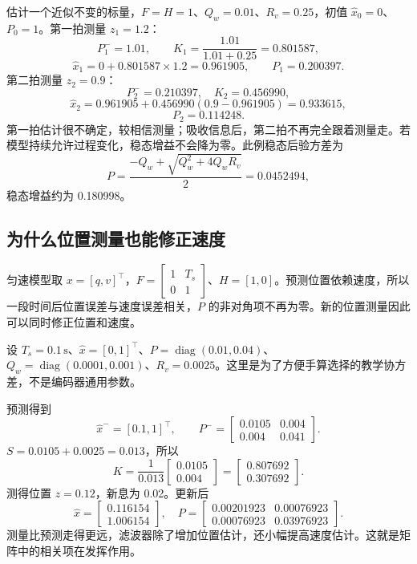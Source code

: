 \begin{examplebox}[算例 14B 两拍标量卡尔曼滤波]
估计一个近似不变的标量，$F=H=1$、$Q_w=0.01$、$R_v=0.25$，初值 $\hat x_0=0$、$P_0=1$。第一拍测量 $z_1=1.2$：
\[
P_1^-=1.01,\qquad K_1=\frac{1.01}{1.01+0.25}=0.801587,
\]
\[
\hat x_1=0+0.801587\times1.2=0.961905,
\qquad P_1=0.200397.
\]
第二拍测量 $z_2=0.9$：
\[
P_2^-=0.210397,\quad K_2=0.456990,
\]
\[
\hat x_2=0.961905+0.456990(0.9-0.961905)=0.933615,
\]
\[
P_2=0.114248.
\]
第一拍估计很不确定，较相信测量；吸收信息后，第二拍不再完全跟着测量走。若模型持续允许过程变化，稳态增益不会降为零。此例稳态后验方差为
\[
P=\frac{-Q_w+\sqrt{Q_w^2+4Q_wR_v}}2=0.0452494,
\]
稳态增益约为 0.180998。
\end{examplebox}

\subsection{为什么位置测量也能修正速度}

匀速模型取 $x=[q,v]^\top$，$F=\left[\begin{smallmatrix}1&T_s\\0&1\end{smallmatrix}\right]$、$H=[1,0]$。预测位置依赖速度，所以一段时间后位置误差与速度误差相关，$P$ 的非对角项不再为零。新的位置测量因此可以同时修正位置和速度。

\begin{examplebox}[算例 14C 矩阵卡尔曼的一次完整更新]
设 $T_s=0.1\,\mathrm{s}$、$\hat x=[0,1]^\top$、$P=\operatorname{diag}(0.01,0.04)$、$Q_w=\operatorname{diag}(0.0001,0.001)$、$R_v=0.0025$。这里是为了方便手算选择的教学协方差，不是编码器通用参数。

预测得到
\[
\hat x^-=[0.1,1]^\top,
\qquad P^-=\begin{bmatrix}0.0105&0.004\\0.004&0.041\end{bmatrix}.
\]
$S=0.0105+0.0025=0.013$，所以
\[
K=\frac1{0.013}\begin{bmatrix}0.0105\\0.004\end{bmatrix}
=\begin{bmatrix}0.807692\\0.307692\end{bmatrix}.
\]
测得位置 $z=0.12$，新息为 0.02。更新后
\[
\hat x=\begin{bmatrix}0.116154\\1.006154\end{bmatrix},
\quad P=\begin{bmatrix}0.00201923&0.00076923\\0.00076923&0.03976923\end{bmatrix}.
\]
测量比预测走得更远，滤波器除了增加位置估计，还小幅提高速度估计。这就是矩阵中的相关项在发挥作用。
\end{examplebox}


